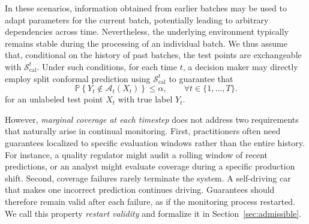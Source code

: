 \documentclass{uai2026} %
\newcommand{\1}{\mathbf{1}}
\newcommand{\prob}{\mathbb{P}}
\newcommand{\scal}{\mathcal{S}}
\newcommand{\ens}[1]{\left\{#1\right\}}
\newcommand{\cali}{\mathrm{cal}}
\newcommand{\scalcal}{\scal_{\cali}}
\newcommand{\acal}{\mathcal{A}}
\begin{document}
In these scenarios, information obtained from earlier batches may be used to adapt parameters for the current batch, potentially leading to arbitrary dependencies across time. Nevertheless, the underlying environment typically remains stable during the processing of an individual batch. We thus assume that, conditional on the history of past batches, the test points are exchangeable with $\scalcal^t$. Under such conditions, for each time $t$, a decision maker may directly employ split conformal prediction using $\scalcal^t$ to guarantee that
\begin{equation}
  \label{eq:marginal_horizon}
  \prob\ens{Y_t\not\in \acal_t(X_t)}\le \alpha,\qquad \forall t\in\{1,\dots,T\}.
\end{equation}
for an unlabeled test point $X_t$ with true label $Y_t$.

However, \textit{marginal coverage at each timestep} does not address two requirements that naturally arise in continual monitoring. First, practitioners often need guarantees localized to specific evaluation windows rather than the entire history. For instance, a quality regulator might audit a rolling window of recent predictions, or an analyst might evaluate coverage during a specific production shift. Second, coverage failures rarely terminate the system. A self-driving car that makes one incorrect prediction continues driving. Guarantees should therefore remain valid after each failure, as if the monitoring process restarted. We call this property \emph{restart validity} and formalize it in Section~\ref{sec:admissible}.
\end{document}
